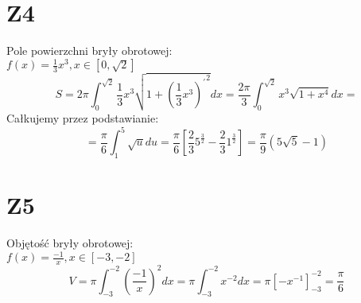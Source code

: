 \documentclass{article}
\begin{document}
\section{Z4}
Pole powierzchni bryły obrotowej:\\
$f(x) = \frac{1}{3}x^3, x \in [0,\sqrt2]$
$$
S = 2\pi \int_0^{\sqrt2} \frac{1}{3}x^3 \sqrt{1 + {\left(\frac{1}{3}x^3 \right)^\prime}^2}dx = \frac{2\pi}{3} \int_0^{\sqrt2} x^3 \sqrt{1 + x^4}dx = 
$$
Całkujemy przez podstawianie:
$$
= \frac{\pi}{6} \int_1^5 \sqrt u du = \frac{\pi}{6} \left[\frac{2}{3} 5^{\frac{3}{2}} - \frac{2}{3} 1^{\frac{3}{2}}\right] = \frac{\pi}{9} \left (5 \sqrt 5  - 1\right)
$$
\section{Z5}
Objętość bryły obrotowej:\\
$f(x) = \frac{-1}{x}, x \in [-3,-2]$
$$
V = \pi \int_{-3}^{-2}  {\left (\frac{-1}{x} \right)}^2 dx = \pi \int_{-3}^{-2} x^{-2} dx = \pi \left [-x^{-1} \right]_{-3}^{-2} = \frac{\pi}{6}
$$
\end{document}
